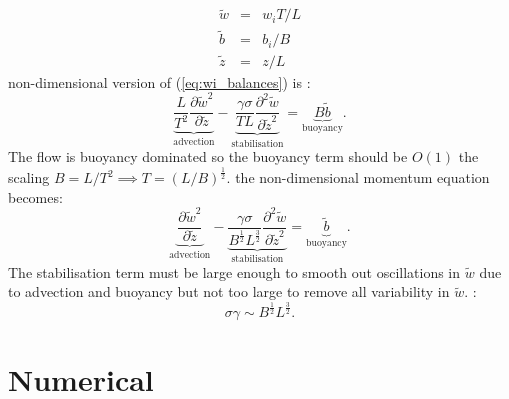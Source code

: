 \documentclass[draft]{agujournal2019}
\begin{document}
\begin{eqnarray*}
\tilde{w} & = & w_{i}T/L\\
\tilde{b} & = & b_{i}/B\\
\tilde{z} & = & z/L
\end{eqnarray*}
 non-dimensional version of (\ref{eq:wi_balances}) is :
\begin{equation}
\underbrace{{\frac{L}{T^{2}}\frac{\partial\tilde{w}^{2}}{\partial\tilde{z}}}}_{\text{advection}}-\underbrace{{\frac{\gamma\sigma}{TL}\frac{\partial^{2}\tilde{w}}{\partial\tilde{z}^{2}}}}_{\text{stabilisation}}=\underbrace{B\tilde{b}}_{\text{buoyancy}}.\label{eq:wi_nonDomTmp}
\end{equation}
The flow is buoyancy dominated so the buoyancy term should be $O(1)$
 the scaling $B=L/T^{2}\implies T=(L/B)^{\frac{1}{2}}$.  the non-dimensional momentum equation becomes:
\begin{equation}
\underbrace{{\frac{\partial\tilde{w}^{2}}{\partial\tilde{z}}}}_{\text{advection}}-\underbrace{{\frac{\gamma\sigma}{B^{\frac{1}{2}}L^{\frac{3}{2}}}\frac{\partial^{2}\tilde{w}}{\partial\tilde{z}^{2}}}}_{\text{stabilisation}}=\underbrace{\tilde{b}}_{\text{buoyancy}}.\label{eq:wi_nonDom-1}
\end{equation}
The stabilisation term must be large enough to smooth out oscillations
in $\tilde{w}$ due to advection and buoyancy but not too large to
remove all variability in $\tilde{w}$. :
\begin{equation}
\sigma\gamma\sim B^{\frac{1}{2}}L^{\frac{3}{2}}.\label{eq:gammaDimAnal}
\end{equation}
\section{\label{sec:numerics}Numerical }
\end{document}

